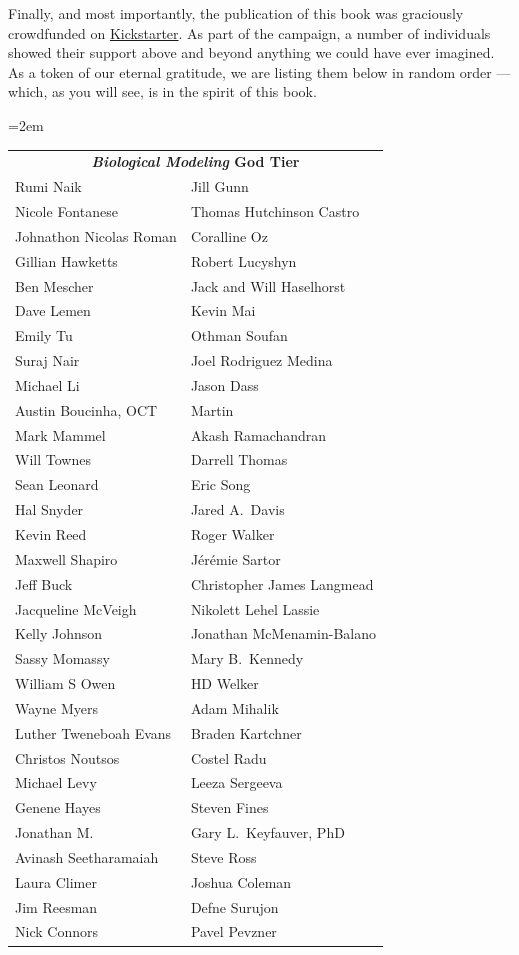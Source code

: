 Finally, and most importantly, the publication of this book was graciously crowdfunded on \href{https://www.kickstarter.com/projects/phillipcompeau/biological-modeling-a-short-tour?ref=user_menu}{Kickstarter}. As part of the campaign, a number of individuals showed their support above and beyond anything we could have ever imagined. As a token of our eternal gratitude, we are listing them below in random order --- which, as you will see, is in the spirit of this book.
\begin{center}
\tabcolsep=2em
\begin{tabular}{l l}
\multicolumn{2}{c}{\textbf{\textit{Biological Modeling} God Tier}}\\[4ex]
Rumi Naik & Jill Gunn\\
Nicole Fontanese & Thomas Hutchinson Castro\\
Johnathon Nicolas Roman & Coralline Oz\\
Gillian Hawketts & Robert Lucyshyn\\
Ben Mescher & Jack and Will Haselhorst\\
Dave Lemen & Kevin Mai\\
Emily Tu & Othman Soufan\\
Suraj Nair & Joel Rodriguez Medina\\
Michael Li & Jason Dass\\
Austin Boucinha, OCT & Martin\\
Mark Mammel & Akash Ramachandran\\
Will Townes & Darrell Thomas\\
Sean Leonard & Eric Song\\
Hal Snyder & Jared A.~Davis\\
Kevin Reed & Roger Walker\\
Maxwell Shapiro & Jérémie Sartor\\
Jeff Buck & Christopher James Langmead\\
Jacqueline McVeigh & Nikolett Lehel Lassie\\
Kelly Johnson & Jonathan McMenamin-Balano\\
Sassy Momassy & Mary B.~Kennedy\\
William S Owen & HD Welker\\
Wayne Myers & Adam Mihalik\\
Luther Tweneboah Evans & Braden Kartchner\\
Christos Noutsos & Costel Radu\\
Michael Levy & Leeza Sergeeva\\
Genene Hayes & Steven Fines\\
Jonathan M. & Gary L.~Keyfauver, PhD\\
Avinash Seetharamaiah & Steve Ross\\
Laura Climer & Joshua Coleman\\
Jim Reesman & Defne Surujon\\
Nick Connors & Pavel Pevzner\\
\end{tabular}
\end{center}

